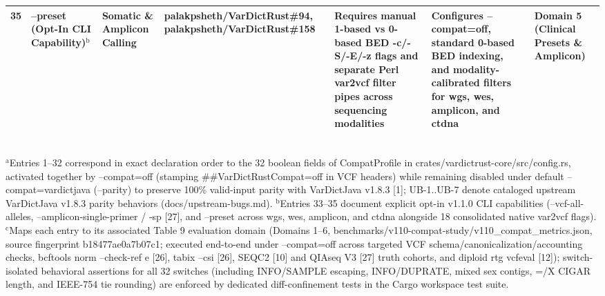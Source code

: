 \begin{table}[htbp]
{\begin{tabular}{lllllll}
35 & --preset (Opt-In CLI Capability)$^{\text{b}}$ & Somatic \& Amplicon Calling & palakpsheth/VarDictRust\#94, palakpsheth/VarDictRust\#158 & Requires manual 1-based vs 0-based BED -c/-S/-E/-z flags and separate Perl var2vcf filter pipes across sequencing modalities & Configures --compat=off, standard 0-based BED indexing, and modality-calibrated filters for wgs, wes, amplicon, and ctdna & Domain 5 (Clinical Presets \& Amplicon) \\
\hline
\end{tabular}%
}
\\[4pt]\footnotesize{$^{\text{a}}$Entries 1--32 correspond in exact declaration order to the 32 boolean fields of CompatProfile in crates/vardictrust-core/src/config.rs, activated together by --compat=off (stamping \#\#VarDictRustCompat=off in VCF headers) while remaining disabled under default --compat=vardictjava (--parity) to preserve 100\% valid-input parity with VarDictJava v1.8.3 [1]; UB-1..UB-7 denote cataloged upstream VarDictJava v1.8.3 parity behaviors (docs/upstream-bugs.md). $^{\text{b}}$Entries 33--35 document explicit opt-in v1.1.0 CLI capabilities (--vcf-all-alleles, --amplicon-single-primer / -sp [27], and --preset across wgs, wes, amplicon, and ctdna alongside 18 consolidated native var2vcf flags). $^{\text{c}}$Maps each entry to its associated Table 9 evaluation domain (Domains 1--6, benchmarks/v110-compat-study/v110\_compat\_metrics.json, source fingerprint b18477ae0a7b07c1; executed end-to-end under --compat=off across targeted VCF schema/canonicalization/accounting checks, bcftools norm --check-ref e [26], tabix --csi [26], SEQC2 [10] and QIAseq V3 [27] truth cohorts, and diploid rtg vcfeval [12]); switch-isolated behavioral assertions for all 32 switches (including INFO/SAMPLE escaping, INFO/DUPRATE, mixed sex contigs, =/X CIGAR length, and IEEE-754 tie rounding) are enforced by dedicated diff-confinement tests in the Cargo workspace test suite.}
\end{table}
